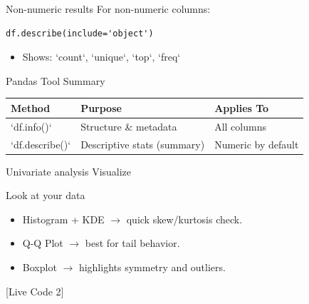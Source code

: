 \documentclass[aspectratio=169]{beamer}
\begin{document}
\begin{frame}[label={sec:orgeb9e608},fragile]{Non-numeric results}
 For non-numeric columns:

\begin{verbatim}
df.describe(include='object')
\end{verbatim}

\begin{itemize}
\item Shows: `count`, `unique`, `top`, `freq`
\end{itemize}
\end{frame}

\begin{frame}[label={sec:org2dd0eaf}]{Pandas Tool Summary}
\begin{center}
\begin{tabular}{lll}
Method & Purpose & Applies To\\[0pt]
\hline
`df.info()` & Structure \& metadata & All columns\\[0pt]
`df.describe()` & Descriptive stats (summary) & Numeric by default\\[0pt]
\end{tabular}
\end{center}
\end{frame}

\begin{frame}[label={sec:org9475f8e}]{Univariate analysis Visualize}
\begin{block}{\alert{Look at your data}}
\begin{itemize}
\item Histogram + KDE \(\rightarrow\) quick skew/kurtosis check.
\item Q-Q Plot \(\rightarrow\) best for tail behavior.
\item Boxplot \(\rightarrow\) highlights symmetry and outliers.
\end{itemize}
[Live Code 2]
\end{block}
\end{frame}
\end{document}
